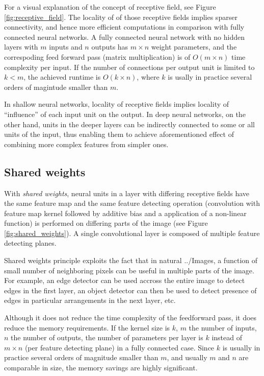 \documentclass[11pt,czech,american,dvipsnames]{book}
\begin{document}
For a visual explanation of the concept of receptive field, see Figure \ref{fig:receptive_field}. The locality of of those receptive fields implies sparser connectivity, and hence more efficient computations in comparison with fully connected neural networks. A fully connected neural network with no hidden layers with $m$ inputs and $n$ outputs has $m \times n$ weight parameters, and the correspoding feed forward pass (matrix multiplication) is of $O(m \times n)$ time complexity per input. If the number of connections per output unit is limited to $k < m$, the achieved runtime is $O(k \times n)$, where $k$ is usally in practice several orders of magintude smaller than $m$. \cite{goodfellow2016}

In shallow neural networks, locality of receptive fields implies locality of ``influence'' of each input unit on the output. In deep neural networks, on the other hand, units in the deeper layers can be indirectly connected to some or all units of the input, thus enabling them to achieve aforementioned effect of combining more complex features from simpler ones.

\subsection{Shared weights}
With \emph{shared weights}, neural units in a layer with differing receptive fields have the same feature map and the same feature detecting operation (convolution with feature map kernel followed by additive bias and a application of a non-linear function) is performed on differing parts of the image (see Figure \ref{fig:shared_weights}). A single convolutional layer is composed of multiple feature detecting planes.

Shared weights principle exploits the fact that in natural ../Images, a function of small number of neighboring pixels can be useful in multiple parts of the image. For example, an edge detector can be used accross the entire image to detect edges in the first layer, an object detector can then be used to detect presence of edges in particular arrangements in the next layer, etc.

Although it does not reduce the time complexity of the feedforward pass, it does reduce the memory requirements. If the kernel size is $k$, $m$ the number of inputs, $n$ the number of outputs, the number of parameters per layer is $k$ instead of $m \times n$ (per feature detecting plane) in a fully connected case. Since $k$ is usually in practice several orders of magnitude smaller than $m$, and usually $m$ and $n$ are comparable in size, the memory savings are highly significant. \cite{goodfellow2016}
\end{document}

